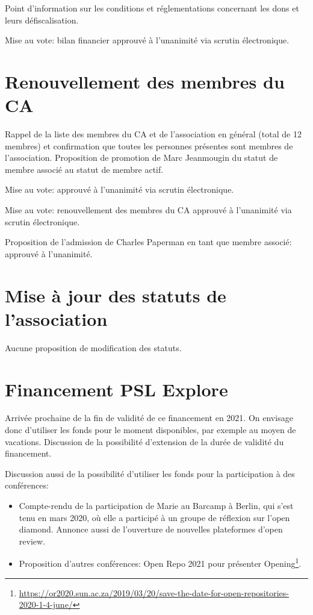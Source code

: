 \documentclass[a4paper]{article}
\begin{document}
Point d'information sur les conditions et réglementations concernant les dons et leurs défiscalisation. 

Mise au vote: bilan financier approuvé à l'unanimité via scrutin électronique.

\section{Renouvellement des membres du CA}
    Rappel de la liste des membres du CA et de l'association en général (total de 12 membres) et confirmation que toutes les personnes présentes sont membres de l'association.
    Proposition de promotion de Marc Jeanmougin du statut de membre associé au statut de membre actif.
    
    Mise au vote: approuvé à l'unanimité via scrutin électronique.
    
    Mise au vote: renouvellement des membres du CA approuvé à l'unanimité via scrutin électronique.
    
    Proposition de l'admission de Charles Paperman en tant que membre associé: approuvé à l'unanimité. 


\section{Mise à jour des statuts de l'association}
Aucune proposition de modification des statuts. 

\section{Financement PSL Explore}
Arrivée prochaine de la fin de validité de ce financement en 2021. On envisage donc d'utiliser les fonds pour le moment disponibles, par exemple au moyen de vacations. Discussion de la possibilité d'extension de la durée de validité du financement. 

Discussion aussi de la possibilité d'utiliser les fonds pour la participation à des conférences: 
\begin{itemize}
\item Compte-rendu de la participation de Marie au Barcamp à Berlin, qui s'est tenu en mars 2020, où elle a participé à un groupe de réflexion sur l'open diamond. Annonce aussi de l'ouverture de nouvelles plateformes d'open review. 
\item Proposition d'autres conférences: Open Repo 2021 pour présenter
Opening\footnote{\tiny \url{https://or2020.sun.ac.za/2019/03/20/save-the-date-for-open-repositories-2020-1-4-june/}}. \end{itemize}
\end{document}
